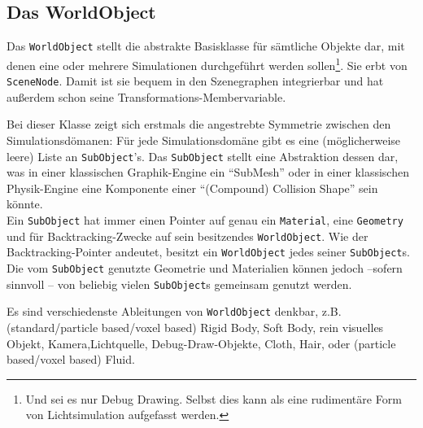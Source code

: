 	


\subsection{Das WorldObject}
	\label{sec:worldObject}
	Das \lstinline|WorldObject| stellt die abstrakte Basisklasse für sämtliche Objekte dar, mit denen eine oder mehrere 
	Simulationen durchgeführt werden sollen\footnote{Und sei es nur Debug Drawing. Selbst dies kann als eine 
	rudimentäre Form von Lichtsimulation aufgefasst werden.}. Sie erbt von \lstinline|SceneNode|. Damit ist sie bequem 
	in den Szenegraphen integrierbar und hat außerdem schon seine Transformations-Membervariable.
	
	Bei dieser Klasse zeigt sich erstmals die angestrebte Symmetrie zwischen den Simulationsdömanen: 
	Für jede Simulationsdomäne
	gibt es eine (möglicherweise leere) Liste an \lstinline|SubObject|'s. Das \lstinline|SubObject| 
	stellt eine Abstraktion dessen dar, was in einer klassischen Graphik-Engine ein "`SubMesh"' oder
	in einer klassischen Physik-Engine eine Komponente einer "`(Compound) Collision Shape"' sein könnte.\\
	Ein \lstinline|SubObject| hat immer einen Pointer auf genau ein \lstinline|Material|, 
	eine \lstinline|Geometry|  und für Backtracking-Zwecke auf sein besitzendes	\lstinline|WorldObject|.
	Wie der Backtracking-Pointer andeutet, besitzt ein \lstinline|WorldObject| jedes seiner \lstinline|SubObject|s.
	Die vom \lstinline|SubObject| genutzte Geometrie und Materialien können jedoch --sofern sinnvoll -- von beliebig
	vielen \lstinline|SubObject|s gemeinsam genutzt werden.
	
	Es sind verschiedenste Ableitungen von \lstinline|WorldObject| denkbar, z.B. 
	(standard/particle based/voxel based) Rigid Body, Soft Body, rein visuelles Objekt,  
	Kamera,Lichtquelle, Debug-Draw-Objekte, Cloth, Hair, oder (particle based/voxel based) Fluid.
	
